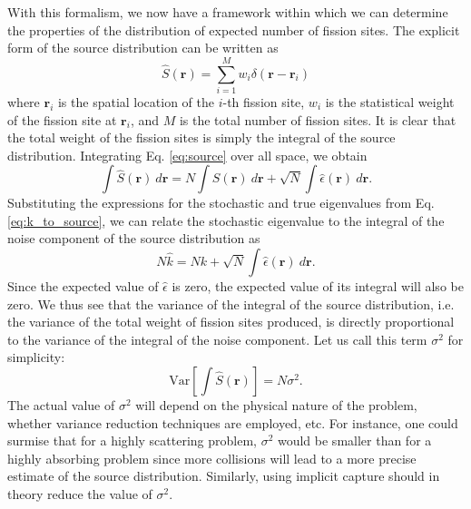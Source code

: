 With this formalism, we now have a framework within which we can
determine the properties of the distribution of expected number of
fission sites. The explicit form of the source distribution can be
written as
\begin{equation}
  \hat{S}(\mathbf{r}) = \sum_{i=1}^{M} w_i \delta( \mathbf{r} -
  \mathbf{r}_i )
\end{equation}
where $\mathbf{r}_i$ is the spatial location of the $i$-th fission
site, $w_i$ is the statistical weight of the fission site at
$\mathbf{r}_i$, and $M$ is the total number of fission sites. It is
clear that the total weight of the fission sites is simply the
integral of the source distribution. Integrating Eq. \ref{eq:source}
over all space, we obtain
\begin{equation}
  \int \hat{S}(\mathbf{r}) \: d\mathbf{r} = N \int S(\mathbf{r}) \:
  d\mathbf{r} + \sqrt{N} \int \hat{\epsilon}(\mathbf{r}) \:
  d\mathbf{r} .
\end{equation}
Substituting the expressions for the stochastic and true eigenvalues
from Eq. \ref{eq:k_to_source}, we can relate the stochastic eigenvalue
to the integral of the noise component of the source distribution as
\begin{equation}
  N\hat{k} = Nk + \sqrt{N} \int \hat{\epsilon}(\mathbf{r}) \:
  d\mathbf{r}.
\end{equation}
Since the expected value of $\hat{\epsilon}$ is zero, the expected value of
its integral will also be zero. We thus see that the variance of the
integral of the source distribution, i.e. the variance of the total
weight of fission sites produced, is directly proportional to the
variance of the integral of the noise component. Let us call this term
$\sigma^2$ for simplicity:
\begin{equation}
  \text{Var} \left[ \int \hat{S}(\mathbf{r}) \right ] = N \sigma^2.
\end{equation}
The actual value of $\sigma^2$ will depend on the physical nature of
the problem, whether variance reduction techniques are employed,
etc. For instance, one could surmise that for a highly scattering
problem, $\sigma^2$ would be smaller than for a highly absorbing
problem since more collisions will lead to a more precise estimate of
the source distribution. Similarly, using implicit capture should in
theory reduce the value of $\sigma^2$.

